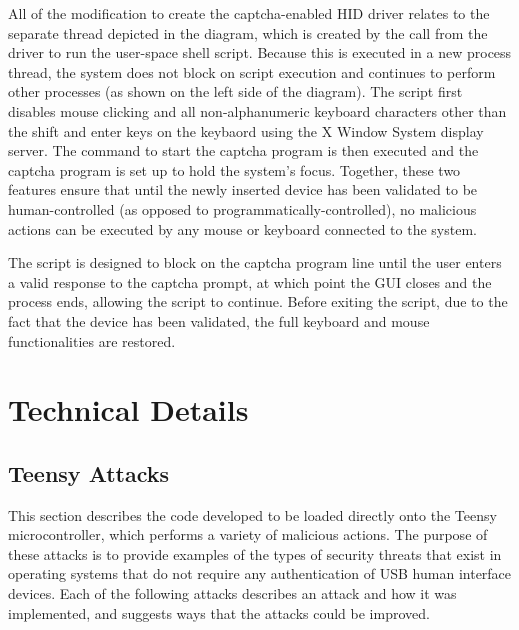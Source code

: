 \documentclass[pagenumbers]{ieee}
\begin{document}
All of the modification to create the captcha-enabled HID driver relates to the separate thread depicted in the diagram, which is created by the call from the driver to run the user-space shell script. Because this is executed in a new process thread, the system does not block on script execution and continues to perform other processes (as shown on the left side of the diagram). The script first disables mouse clicking and all non-alphanumeric keyboard characters other than the shift and enter keys on the keybaord using the X Window System display server. The command to start the captcha program is then executed and the captcha program is set up to hold the system's focus. Together, these two features ensure that until the newly inserted device has been validated to be human-controlled (as opposed to programmatically-controlled), no malicious actions can be executed by any mouse or keyboard connected to the system. 

The script is designed to block on the captcha program line until the user enters a valid response to the captcha prompt, at which point the GUI closes and the process ends, allowing the script to continue. Before exiting the script, due to the fact that the device has been validated, the full keyboard and mouse functionalities are restored.



\section{Technical Details}
\label{section:technical}


\subsection{Teensy Attacks}
\label{section:teensy}

This section describes the code developed to be loaded directly onto the Teensy microcontroller, which performs a variety of malicious actions. The purpose of these attacks is to provide examples of the types of security threats that exist in operating systems that do not require any authentication of USB human interface devices. Each of the following attacks describes an attack and how it was implemented, and suggests ways that the attacks could be improved.
\end{document}
